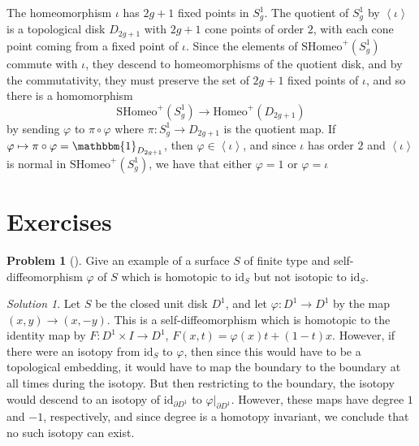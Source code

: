 \documentclass[reqno]{amsart}
\theoremstyle{definition}
\newtheorem{problem}[theorem]{Problem}
\theoremstyle{remark}
\newtheorem*{solution}{Solution}
\newcommand{\id}{{\mathrm{id}}}
\newcommand{\Homeo}{{\mathrm{Homeo}}}
\newcommand{\SHomeo}{{\mathrm{SHomeo}}}
\begin{document}
 The homeomorphism $\iota$ has
  $2g+1$ fixed points in
   $S_g^{1}$. The quotient of
   $S_g^{1}$ by $\left<\iota \right>$ is
   a topological disk
   $D_{2g+1}$ with $2g+1$ cone points of order
   $2$, with each cone point coming from a fixed point of $\iota$.
   Since the elements of  $\SHomeo^{+} \left( S_g^{1} \right) $ 
   commute with $\iota$, they descend to homeomorphisms
   of the quotient disk, and by the commutativity, they
   must preserve the set of  $2g+1$ fixed points of $\iota$,
   and so there is a homomorphism
    \[
   \SHomeo^{+} \left( S_g^{1} \right) 
   \to \Homeo^{+} \left( D_{2g+1} \right) 
   \] 
   by sending
   $\varphi $ to
   $\pi \circ \varphi $ where
   $\pi \colon S_g^{1} \to 
   D_{2g+1}$ is the quotient map. If
   $\varphi  \mapsto \pi \circ \varphi  = \mathbbm{1}_{
   D_{2g+1}}$, then $\varphi  
   \in \left<\iota \right>$, and since $\iota$ has
   order  $2$ and
   $\left<\iota \right>$ is normal in
   $\SHomeo^{+} \left( S_g^{1} \right) $, we have
   that either $\varphi  = 1$ or $\varphi  = \iota$

 


\newpage

\section{Exercises}

\begin{problem}[]
    Give an example of a surface $S$ of finite type and
    self-diffeomorphism $\varphi $ of $S$ which is
    homotopic to $\id_S$ but not isotopic to $\id_S$.
\end{problem}

\begin{solution}
    Let $S$ be the closed
    unit disk $D^{1}$, and let $\varphi \colon D^{1} \to D^{1}$
    by the map $\left( x,y \right) \to (x,-y)$.
    This is a self-diffeomorphism which is homotopic to
    the identity map by
    $F \colon D^{1} \times I \to D^{1}$,
    $F(x,t) = \varphi(x) t + (1-t)x$. However,
    if there were an isotopy from $\id_S$ to 
    $\varphi$, then since this would have to be a topological embedding, it
    would have to map the boundary to the boundary at all
    times during the isotopy. But then restricting to the boundary,
    the isotopy would descend to an isotopy of
     $\id_{\partial D^{1}}$ to $\varphi|_{\partial D^{1}}$.
     However, these maps have degree $1$ and $-1$, respectively,
     and since degree is a homotopy invariant,
     we conclude that no such isotopy can exist.
\end{solution}
\end{document}
